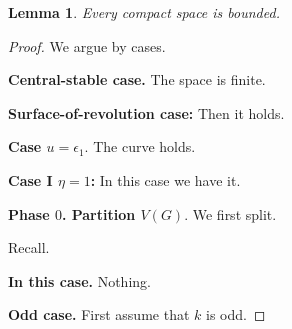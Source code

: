 \documentclass{article}
\newtheorem{lemma}{Lemma}
\begin{document}
\begin{lemma} Every compact space is bounded. \end{lemma}
\begin{proof}
We argue by cases.

\textbf{Central-stable case.}
The space is finite.

\textbf{Surface-of-revolution case:} Then it holds.

\textbf{Case $u=\epsilon_1.$} The curve holds.

\textbf{Case I $\eta=1$:} In this case we have it.

\noindent \textbf{Phase $0$. Partition $V(G)$}. We first split.

 Recall.

\textbf{In this case.} Nothing.

\textbf{Odd case.} First assume that $k$ is odd.
\end{proof}
\end{document}
